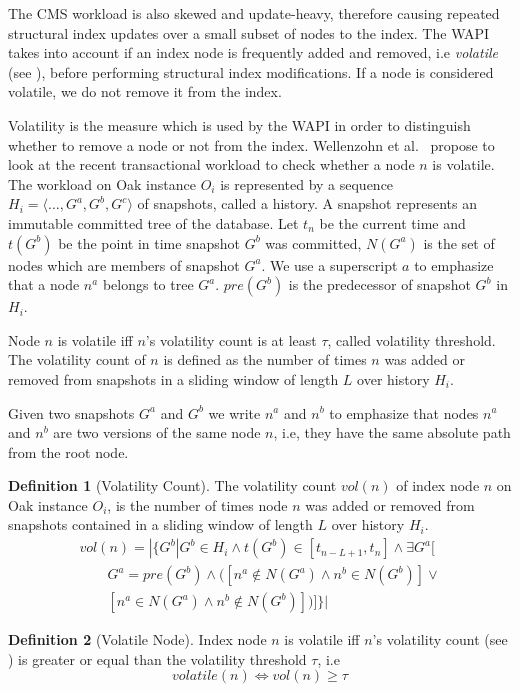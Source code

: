 \documentclass[abstracton,12pt]{scrartcl}
\theoremstyle{definition}
\newtheorem{definition}{Definition}
\begin{document}
The CMS workload is also skewed and update-heavy, therefore causing repeated structural index
updates over a small subset of nodes to the index.
The WAPI takes into account if an index node is frequently added and removed,
i.e \textit{volatile} (see ), before performing structural
index modifications. If a node is considered volatile, we do not remove it from the index.

Volatility is the measure which is used by the WAPI in order to distinguish
whether to remove a node or not from the index.
Wellenzohn et al.~\cite{KW17} propose to look at the recent transactional
workload to check whether a node $n$ is volatile. The workload on Oak instance
$O_i$ is represented by a sequence $H_i = \langle \ldots, G^a, G^b, G^c
\rangle$ of snapshots, called a history. A snapshot represents an immutable
committed tree of the database. Let $t_n$ be the current time and
$t(G^b)$ be the point in time snapshot $G^b$ was committed, $N(G^a)$ is the
set of nodes which are members of snapshot $G^a$. We use a superscript $a$
to emphasize that a node $n^a$ belongs to tree $G^a$. $pre(G^b)$ is the
predecessor of snapshot $G^b$ in $H_i$.

Node $n$ is volatile iff $n$'s volatility count is at least $\tau$, called
volatility threshold. The volatility count of $n$ is defined as the number of
times $n$ was added or removed from snapshots in a sliding window of length
$L$ over history $H_i$.

Given two snapshots $G^a$ and $G^b$ we write $n^a$ and $n^b$ to emphasize that
nodes $n^a$ and $n^b$ are two versions of the same node $n$, i.e, they have
the same absolute path from the root node.

\begin{definition}[Volatility Count]
  The volatility count $vol(n)$ of index node $n$ on Oak instance $O_i$, is the number of
  times node $n$ was added or removed from snapshots contained in a sliding
  window of length $L$ over history $H_i$.
  \begin{align*}
    vol(n) = | \{ G^b | G^b \in H_i \land t(G^b) \in [t_{n-L+1}, t_n] \land \exists G^a[ \\
    \qquad G^a = pre(G^b) \land ([n^a \notin N(G^a) \land n^b \in N(G^b)]\lor \\
    \qquad [n^a \in N(G^a) \land n^b \notin N(G^b)] )]\} |
  \end{align*}
  \label{def:vol_count}
\end{definition}

\begin{definition}[Volatile Node]
  Index node $n$ is volatile iff $n$'s volatility count (see
  ) is greater or equal than the volatility threshold
  $\tau$, i.e
  $$ volatile(n) \iff vol(n) \geq \tau $$
  \label{def:volatile_node}
\end{definition}
\end{document}
